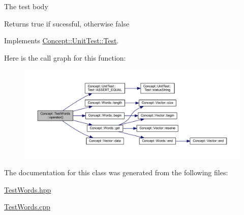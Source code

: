 The test body \begin{DoxyReturn}{Returns}
true if sucessful, otherwise false 
\end{DoxyReturn}


Implements \mbox{\hyperlink{class_concept_1_1_unit_test_1_1_test_aa8c081714f642696eeef640911be752a}{Concept\+::\+Unit\+Test\+::\+Test}}.

Here is the call graph for this function\+:\nopagebreak
\begin{figure}[H]
\begin{center}
\leavevmode
\includegraphics[width=350pt]{class_concept_1_1_test_words_ac268229701b31e0aab5764227b9cdf0b_cgraph}
\end{center}
\end{figure}


The documentation for this class was generated from the following files\+:\begin{DoxyCompactItemize}
\item 
\mbox{\hyperlink{_test_words_8hpp}{Test\+Words.\+hpp}}\item 
\mbox{\hyperlink{_test_words_8cpp}{Test\+Words.\+cpp}}\end{DoxyCompactItemize}
